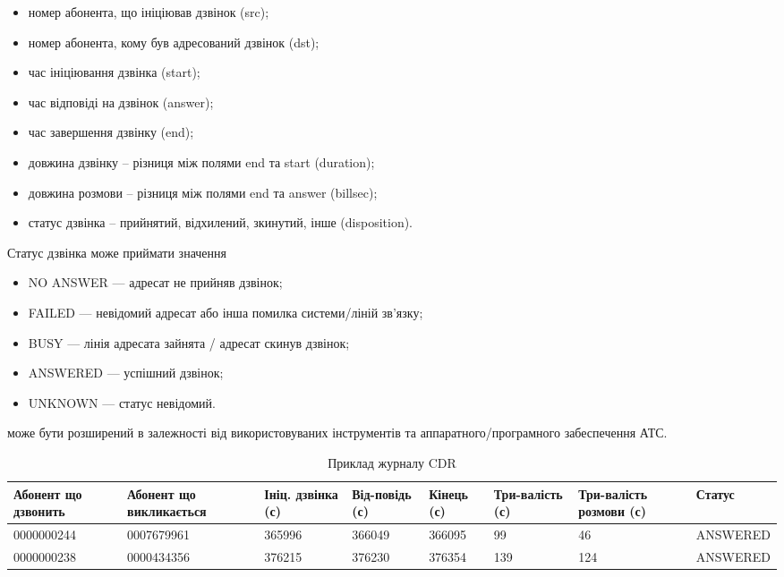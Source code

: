    \begin{itemize}
    \item номер абонента, що ініціював дзвінок (src);
    \item номер абонента, кому був адресований дзвінок (dst);
    \item час ініціювання дзвінка (start);
    \item час відповіді на дзвінок (answer);
    \item час завершення дзвінку (end);
    \item довжина дзвінку -- різниця між полями end та start (duration);
    \item довжина розмови -- різниця між полями end та answer (billsec);
    \item статус дзвінка -- прийнятий, відхилений, зкинутий, інше (disposition).
  \end{itemize}

  Статус дзвінка може приймати значення

  \begin{itemize}
    \item NO ANSWER --- адресат не прийняв дзвінок;
    \item FAILED --- невідомий адресат або інша помилка системи/ліній зв'язку;
    \item BUSY --- лінія адресата зайнята / адресат скинув дзвінок;
    \item ANSWERED --- успішний дзвінок;
    \item UNKNOWN --- статус невідомий.
  \end{itemize}

  може бути розширений в залежності від використовуваних інструментів та аппаратного/програмного забеспечення АТС.

  \begin{table}[h]
  \footnotesize
  \caption{Приклад журналу CDR}
        \begin{tabularx}{\textwidth}{| X | X | X | X | X | X | X | X |}
          \hline
          Абонент що дзвонить & Абонент що викликається & Ініц. дзвінка (с) & Від-повідь (с) & Кінець (с) & Три-валість (с) & Три-валість розмови (с) & Статус \\ \hline
          \scriptsize{0000000244} & \scriptsize{0007679961} & 365996 & 366049 & 366095 & 99 & 46 & \scriptsize{ANSWERED} \\ \hline
          \scriptsize{0000000238} & \scriptsize{0000434356} & 376215 & 376230 & 376354 & 139 & 124 & \scriptsize{ANSWERED}  \\ \hline
      \end{tabularx}
      \label{tab:cdr-log-example}
  \end{table}


